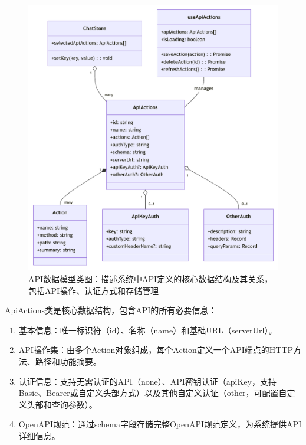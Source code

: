 \begin{figure}[htbp]
  \centering
  \includegraphics[width=\textwidth]{figures/api_actions_class.pdf}
  \caption{API数据模型类图：描述系统中API定义的核心数据结构及其关系，包括API操作、认证方式和存储管理}
  \label{fig:api_actions_class}
\end{figure}

ApiActions类是核心数据结构，包含API的所有必要信息：

\begin{enumerate}
  \item 基本信息：唯一标识符（id）、名称（name）和基础URL（serverUrl）。
  
  \item API操作集：由多个Action对象组成，每个Action定义一个API端点的HTTP方法、路径和功能摘要。
  
  \item 认证信息：支持无需认证的API（none）、API密钥认证（apiKey，支持Basic、Bearer或自定义头部方式）以及其他自定义认证（other，可配置自定义头部和查询参数）。
  
  \item OpenAPI规范：通过schema字段存储完整OpenAPI规范定义，为系统提供API详细信息。
\end{enumerate}

